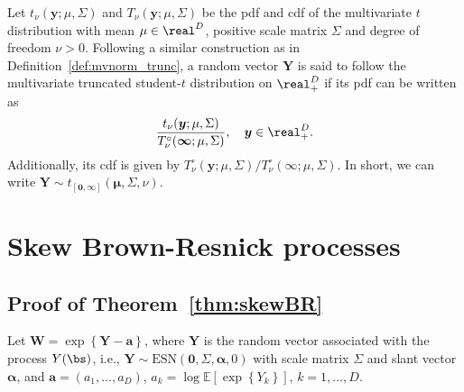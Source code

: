 \documentclass[12pt]{article}
\begin{document}
\begin{definition}
Let $t_\nu(\bm y; \mu, \Sigma)$ and $T_\nu(\bm y; \mu, \Sigma)$ be the pdf and cdf of the multivariate $t$ distribution with mean $\mu\in\real^D$, positive scale matrix $\Sigma$ and degree of freedom $\nu>0$. Following a similar construction as in Definition~\ref{def:mvnorm_trunc}, a random vector $\bm Y$ is said to follow the multivariate truncated student-$t$ distribution on $\real^D_+$ if its pdf can be written as
%
$$
\frac{t_\nu(\bm y; \mu, \Sigma)}{T_{\nu}^\circ( \bm \infty;\mu,\Sigma)}, \quad \bm y \in \real^D_+.
$$
%
Additionally, its cdf is given by $T_{\nu}^\circ( \bm y;\mu,\Sigma)/ T_{\nu}^\circ( \bm \infty;\mu,\Sigma)$. In short, we can write $\bm Y \sim t_{\left[ \bm 0 , \bm \infty \right]}(\bm \mu, \Sigma, \nu)$.
\end{definition}

\section{Skew Brown-Resnick processes}
\label{sec:skew-log-normal_appendix}

\subsection{Proof of Theorem~\ref{thm:skewBR}}

Let $\bm W = \exp\left\{ \bm Y - \bm a \right\}$, where $\bm Y$ is the random vector associated with the process $Y(\bs)$, i.e., $\bm Y \sim \text{ESN}(\bm 0,\Sigma,\bm\alpha,0)$ with scale matrix $\Sigma$ and slant vector $\bm \alpha$, and $\bm a = (a_1, \ldots, a_D)$, $a_k=\log \mathbb E\left[\exp\left\{Y_k \right\}\right]$, $k=1, \ldots, D$. 
\end{document}
